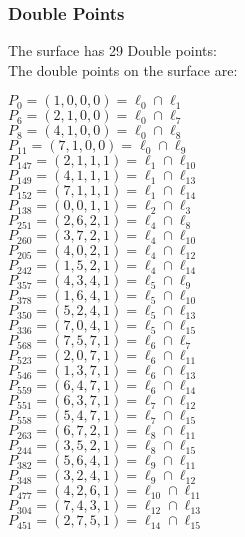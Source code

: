 \documentclass{article}
\begin{document}
{\subsubsection*{Double Points}
The surface has 29 Double points:\\
The double points on the surface are:\\
\begin{multicols}{2}
\noindent
$P_{0} = ( 1, 0, 0, 0 ) = \ell_{0} \cap \ell_{1} $\\
$P_{6} = ( 2, 1, 0, 0 ) = \ell_{0} \cap \ell_{7} $\\
$P_{8} = ( 4, 1, 0, 0 ) = \ell_{0} \cap \ell_{8} $\\
$P_{11} = ( 7, 1, 0, 0 ) = \ell_{0} \cap \ell_{9} $\\
$P_{147} = ( 2, 1, 1, 1 ) = \ell_{1} \cap \ell_{10} $\\
$P_{149} = ( 4, 1, 1, 1 ) = \ell_{1} \cap \ell_{13} $\\
$P_{152} = ( 7, 1, 1, 1 ) = \ell_{1} \cap \ell_{14} $\\
$P_{138} = ( 0, 0, 1, 1 ) = \ell_{2} \cap \ell_{3} $\\
$P_{251} = ( 2, 6, 2, 1 ) = \ell_{4} \cap \ell_{8} $\\
$P_{260} = ( 3, 7, 2, 1 ) = \ell_{4} \cap \ell_{10} $\\
$P_{205} = ( 4, 0, 2, 1 ) = \ell_{4} \cap \ell_{12} $\\
$P_{242} = ( 1, 5, 2, 1 ) = \ell_{4} \cap \ell_{14} $\\
$P_{357} = ( 4, 3, 4, 1 ) = \ell_{5} \cap \ell_{9} $\\
$P_{378} = ( 1, 6, 4, 1 ) = \ell_{5} \cap \ell_{10} $\\
$P_{350} = ( 5, 2, 4, 1 ) = \ell_{5} \cap \ell_{13} $\\
$P_{336} = ( 7, 0, 4, 1 ) = \ell_{5} \cap \ell_{15} $\\
$P_{568} = ( 7, 5, 7, 1 ) = \ell_{6} \cap \ell_{7} $\\
$P_{523} = ( 2, 0, 7, 1 ) = \ell_{6} \cap \ell_{11} $\\
$P_{546} = ( 1, 3, 7, 1 ) = \ell_{6} \cap \ell_{13} $\\
$P_{559} = ( 6, 4, 7, 1 ) = \ell_{6} \cap \ell_{14} $\\
$P_{551} = ( 6, 3, 7, 1 ) = \ell_{7} \cap \ell_{12} $\\
$P_{558} = ( 5, 4, 7, 1 ) = \ell_{7} \cap \ell_{15} $\\
$P_{263} = ( 6, 7, 2, 1 ) = \ell_{8} \cap \ell_{11} $\\
$P_{244} = ( 3, 5, 2, 1 ) = \ell_{8} \cap \ell_{15} $\\
$P_{382} = ( 5, 6, 4, 1 ) = \ell_{9} \cap \ell_{11} $\\
$P_{348} = ( 3, 2, 4, 1 ) = \ell_{9} \cap \ell_{12} $\\
$P_{477} = ( 4, 2, 6, 1 ) = \ell_{10} \cap \ell_{11} $\\
$P_{304} = ( 7, 4, 3, 1 ) = \ell_{12} \cap \ell_{13} $\\
$P_{451} = ( 2, 7, 5, 1 ) = \ell_{14} \cap \ell_{15} $\\
\end{multicols}
}
\end{document}
